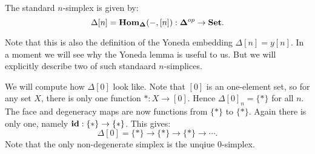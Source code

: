 \begin{definition}
	The standard $n$-simplex is given by:
	$$\Delta[n] = \mathbf{Hom}_{\mathbf{\Delta}}(-, [n]) : \mathbf{\Delta}^{op} \to \mathbf{Set}.$$
\end{definition}

Note that this is also the definition of the Yoneda embedding $\Delta[n] = y[n]$. In a moment we will see why the Yoneda lemma is useful to us. But we will explicitly describe two of such standaard $n$-simplices.

\begin{example}
	We will compute how $\Delta[0]$ look like. Note that $[0]$ is an one-element set, so for any set $X$, there is only one function $\ast : X \to [0]$. Hence $\Delta[0]_n = \{\ast\}$ for all $n$. The face and degeneracy maps are now functions from $\{\ast\}$ to $\{\ast\}$. Again there is only one, namely $\mathbf{id} : \{\ast\} \to \{\ast\}$. This gives:
	$$ \Delta[0] = \{\ast\} \to \{\ast\} \to \{\ast\} \to \cdots. $$
	Note that the only non-degenerate simplex is the unqiue $0$-simplex.
\end{example}


